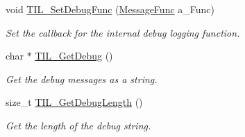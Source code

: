 \begin{DoxyCompactItemize}
void \hyperlink{namespacetil_a4e9b5c8b33ec4ec38e7ef895a8eac58e}{TIL\_\-SetDebugFunc} (\hyperlink{namespacetil_a4cd3def0937f0e817958cdcc44241549}{MessageFunc} a\_\-Func)
\begin{DoxyCompactList}\small\item\em Set the callback for the internal debug logging function. \item\end{DoxyCompactList}\item 
char $\ast$ \hyperlink{namespacetil_a718bbc00caa8c13af40909fddc9b0f43}{TIL\_\-GetDebug} ()
\begin{DoxyCompactList}\small\item\em Get the debug messages as a string. \item\end{DoxyCompactList}\item 
size\_\-t \hyperlink{namespacetil_a3ffda784e3632247d9759e5d3ac5bfbd}{TIL\_\-GetDebugLength} ()
\begin{DoxyCompactList}\small\item\em Get the length of the debug string. \item\end{DoxyCompactList}\end{DoxyCompactItemize}
